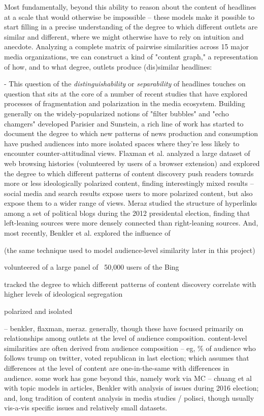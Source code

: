 \documentclass{scrartcl}
\begin{document}
Most fundamentally, beyond this ability to reason about the content of headlines at a scale that would otherwise be impossible -- these models make it possible to start filling in a precise understanding of the degree to which different outlets are similar and different, where we might otherwise have to rely on intuition and anecdote. Analyzing a complete matrix of pairwise similarities across 15 major media organizations, we can construct a kind of "content graph," a representation of how, and to what degree, outlets produce (dis)similar headlines:


- This question of the \textit{distinguishability} or \textit{separability} of headlines touches on question that sits at the core of a number of recent studies that have explored processes of fragmentation and polarization in the media ecosystem. Building generally on the widely-popularized notions of "filter bubbles" and "echo chamgers" developed Parisier and Sunstein, a rich line of work has started to document the degree to which new patterns of news production and consumption have pushed audiences into more isolated spaces where they're less likely to encounter counter-attitudinal views. Flaxman et al. analyzed a large dataset of web browsing histories (volunteered by users of a browser extension) and explored the degree to which different patterns of content discovery push readers towards more or less ideologically polarized content, finding interestingly mixed results -- social media and search results expose users to more polarized content, but also expose them to a wider range of views. Meraz studied the structure of hyperlinks among a set of political blogs during the 2012 presidental election, finding that left-leaning sources were more densely connected than right-leaning sources. And, most recently, Benkler et al. explored the influence of

(the same technique used to model audience-level similarity later in this project)

volunteered of a large panel of ~50,000 users of the Bing

tracked the degree to which different patterns of content discovery correlate with higher levels of ideological segregation

polarized and isolated


 -- benkler, flaxman, meraz. generally, though these have focused primarily on relationships among outlets at the level of audience composition. content-level similarities are often derived from audience composition -- eg, \% of audience who follows trump on twitter, voted republican in last election; which assumes that differences at the level of content are one-in-the-same with differences in audience. some work has gone beyond this, namely work via MC -- chuang et al with topic models in articles, Benkler with analysis of issues during 2016 election; and, long tradition of content analysis in media studies / polisci, though usually vis-a-vis specific issues and relatively small datasets.
\end{document}

